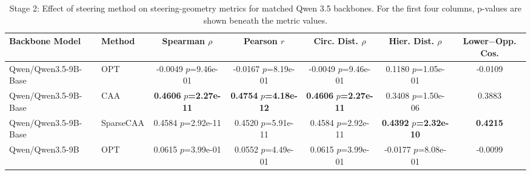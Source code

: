 \begin{table}[ht]
    \centering
    \caption{Stage 2: Effect of steering method on steering-geometry metrics for matched Qwen 3.5 backbones. For the first four columns, p-values are shown beneath the metric values.}
    \label{tab:stage2_geometry}
    \setlength{\tabcolsep}{6pt}
    \renewcommand{\arraystretch}{1.15}
    \small
    \begin{tabular}{ll c c c c c}
        \toprule
        \textbf{Backbone Model} & \textbf{Method} & \textbf{Spearman $\rho$} & \textbf{Pearson $r$} & \textbf{Circ. Dist. $\rho$} & \textbf{Hier. Dist. $\rho$} & \textbf{Lower$-$Opp. Cos.} \\
        \midrule
        Qwen/Qwen3.5-9B-Base & OPT & \shortstack{-0.0049\\{\scriptsize $p$=9.46e-01}} & \shortstack{-0.0167\\{\scriptsize $p$=8.19e-01}} & \shortstack{-0.0049\\{\scriptsize $p$=9.46e-01}} & \shortstack{0.1180\\{\scriptsize $p$=1.05e-01}} & -0.0109 \\
        Qwen/Qwen3.5-9B-Base & CAA & \shortstack{\textbf{0.4606}\\{\scriptsize \textbf{$p$=2.27e-11}}} & \shortstack{\textbf{0.4754}\\{\scriptsize \textbf{$p$=4.18e-12}}} & \shortstack{\textbf{0.4606}\\{\scriptsize \textbf{$p$=2.27e-11}}} & \shortstack{0.3408\\{\scriptsize $p$=1.50e-06}} & 0.3883 \\
        Qwen/Qwen3.5-9B-Base & SparseCAA & \shortstack{0.4584\\{\scriptsize $p$=2.92e-11}} & \shortstack{0.4520\\{\scriptsize $p$=5.91e-11}} & \shortstack{0.4584\\{\scriptsize $p$=2.92e-11}} & \shortstack{\textbf{0.4392}\\{\scriptsize \textbf{$p$=2.32e-10}}} & \textbf{0.4215} \\
        \midrule
        Qwen/Qwen3.5-9B & OPT & \shortstack{0.0615\\{\scriptsize $p$=3.99e-01}} & \shortstack{0.0552\\{\scriptsize $p$=4.49e-01}} & \shortstack{0.0615\\{\scriptsize $p$=3.99e-01}} & \shortstack{-0.0177\\{\scriptsize $p$=8.08e-01}} & -0.0099 \\

\end{tabular}
\end{table}
